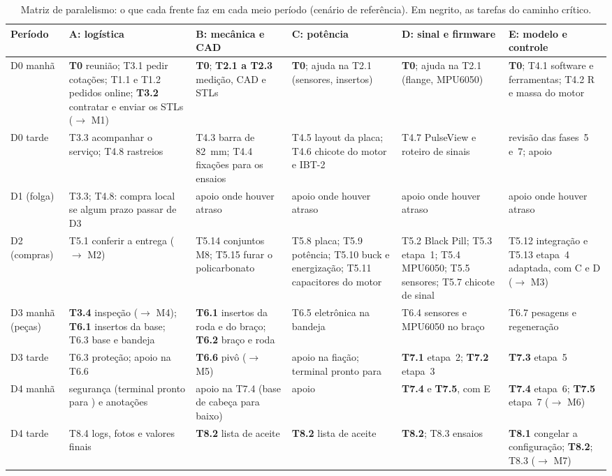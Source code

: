 \documentclass[11pt,a4paper]{article}
\renewcommand{\arraystretch}{1.15}
\newcommand{\cmd}[1]{\texttt{\detokenize{#1}}}   %
\newcommand{\flecha}{\ensuremath{\rightarrow}}
\begin{document}
\begin{landscape}
\begin{table}[p]
\centering\scriptsize
\caption{Matriz de paralelismo: o que cada frente faz em cada meio período (cenário de
referência). Em negrito, as tarefas do caminho crítico.}
\label{tab:matriz}
\renewcommand{\arraystretch}{1.35}
\begin{tabularx}{\linewidth}{@{}>{\raggedright\arraybackslash}p{2.1cm}*{5}{>{\raggedright\arraybackslash}X}@{}}
\toprule
Período & A: logística & B: mecânica e CAD & C: potência & D: sinal e firmware & E: modelo e controle \\
\midrule
D0 manhã & \textbf{T0} reunião; T3.1 pedir cotações; T1.1 e T1.2 pedidos online;
  \textbf{T3.2} contratar e enviar os STLs (\flecha{} M1)
  & \textbf{T0}; \textbf{T2.1 a T2.3} medição, CAD e STLs
  & \textbf{T0}; ajuda na T2.1 (sensores, insertos)
  & \textbf{T0}; ajuda na T2.1 (flange, MPU6050)
  & \textbf{T0}; T4.1 software e ferramentas; T4.2 R e massa do motor \\
\midrule
D0 tarde & T3.3 acompanhar o serviço; T4.8 rastreios
  & T4.3 barra de 82~mm; T4.4 fixações para os ensaios
  & T4.5 layout da placa; T4.6 chicote do motor e IBT-2
  & T4.7 PulseView e roteiro de sinais
  & revisão das fases~5 e~7; apoio \\
\midrule
D1 (folga) & T3.3; T4.8: compra local se algum prazo passar de D3
  & apoio onde houver atraso & apoio onde houver atraso & apoio onde houver atraso
  & apoio onde houver atraso \\
\midrule
D2 (compras) & T5.1 conferir a entrega (\flecha{} M2)
  & T5.14 conjuntos M8; T5.15 furar o policarbonato
  & T5.8 placa; T5.9 potência; T5.10 buck e energização; T5.11 capacitores do motor
  & T5.2 Black Pill; T5.3 etapa~1; T5.4 MPU6050; T5.5 sensores; T5.7 chicote de sinal
  & T5.12 integração e T5.13 etapa~4 adaptada, com C e D (\flecha{} M3) \\
\midrule
D3 manhã (peças) & \textbf{T3.4} inspeção (\flecha{} M4); \textbf{T6.1} insertos da base;
  T6.3 base e bandeja
  & \textbf{T6.1} insertos da roda e do braço; \textbf{T6.2} braço e roda
  & T6.5 eletrônica na bandeja
  & T6.4 sensores e MPU6050 no braço
  & T6.7 pesagens e regeneração \\
\midrule
D3 tarde & T6.3 proteção; apoio na T6.6
  & \textbf{T6.6} pivô (\flecha{} M5)
  & apoio na fiação; terminal pronto para \cmd{s}
  & \textbf{T7.1} etapa~2; \textbf{T7.2} etapa~3
  & \textbf{T7.3} etapa~5 \\
\midrule
D4 manhã & segurança (terminal pronto para \cmd{s}) e anotações
  & apoio na T7.4 (base de cabeça para baixo)
  & apoio
  & \textbf{T7.4} e \textbf{T7.5}, com E
  & \textbf{T7.4} etapa~6; \textbf{T7.5} etapa~7 (\flecha{} M6) \\
\midrule
D4 tarde & T8.4 logs, fotos e valores finais
  & \textbf{T8.2} lista de aceite
  & \textbf{T8.2} lista de aceite
  & \textbf{T8.2}; T8.3 ensaios
  & \textbf{T8.1} congelar a configuração; \textbf{T8.2}; T8.3 (\flecha{} M7) \\
\bottomrule
\end{tabularx}
\end{table}
\end{landscape}
\end{document}
